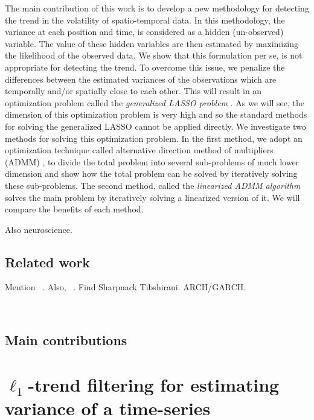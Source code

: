 \documentclass{article}
\begin{document}
The main contribution of this work is to develop a new methodology for detecting the trend in the volatility of spatio-temporal data. In this methodology, the variance at each position and time, is considered as a hidden (un-observed) variable. The value of these hidden variables are then estimated by maximizing the likelihood of the observed data. We show that this formulation per se, is not appropriate for detecting the trend. To overcome this issue, we penalize the differences between the estimated variances of the observations which are temporally and/or spatially close to each other. This will result in an optimization problem called the \textit{generalized LASSO problem} \citep{tibshirani_solution_2011}. As we will see, the dimension of this optimization problem is very high and so the standard methods for solving the generalized LASSO cannot be applied directly. We investigate two methods for solving this optimization problem. In the first method, we adopt an optimization technique called alternative direction method of multipliers (ADMM) \citep{boyd_distributed_2011}, to divide the total problem into several sub-problems of much lower dimension and show how the total problem can be solved by iteratively solving these sub-problems. The second method, called the \textit{linearized ADMM algorithm} \citep{parikh_proximal_2014} solves the main problem by iteratively solving a linearized version of it. We will compare the benefits of each method.

Also neuroscience.


\subsection{Related work}

Mention ~\citep{KimKoh2009,HallacPark2017}. Also, ~\citep{Tibshirani2014,TibshiraniTaylor2011}. Find Sharpnack Tibshirani. ARCH/GARCH.

\citep{SadhanalaWang2017,LinSharpnack2017,WangSharpnack2016}~\citep{RamdasTibshirani2016}

\subsection{Main contributions}

\section{$\ell_1$-trend filtering for estimating variance of a time-series}
\end{document}
